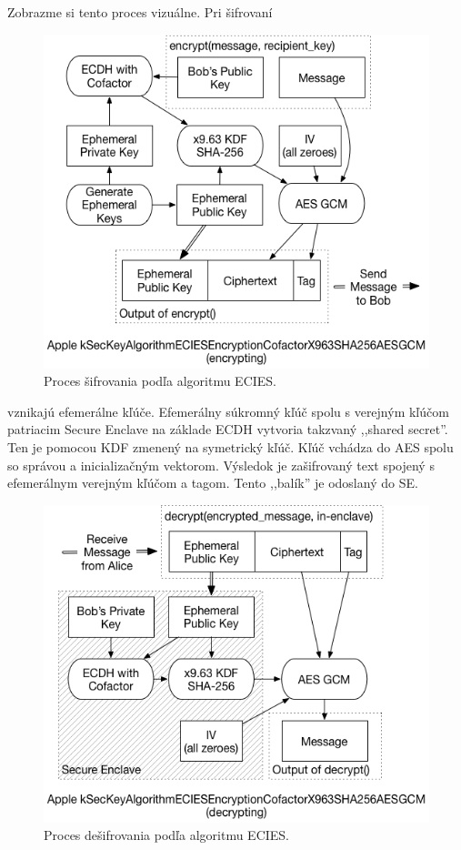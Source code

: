 \noindent Zobrazme si tento proces vizuálne. Pri šifrovaní
\begin{figure}[H]
  \centering
  \includegraphics[width=15cm]{img/ecies-arch-encrypt.png}
  \caption{Proces šifrovania podľa algoritmu ECIES.}
  \label{SEencr}
\end{figure}

\noindent vznikajú efemerálne kľúče. Efemerálny súkromný kľúč spolu s verejným kľúčom patriacim Secure Enclave na základe ECDH vytvoria takzvaný ,,shared secret''. Ten je pomocou KDF zmenený na symetrický kľúč. Kľúč vchádza do AES spolu so správou a inicializačným vektorom. Výsledok je zašifrovaný text spojený s efemerálnym verejným kľúčom a tagom. Tento ,,balík'' je odoslaný do SE. 
\begin{figure}[H]
  \centering
  \includegraphics[width=15cm]{img/ecies-arch-decrypt.png}
  \caption{Proces dešifrovania podľa algoritmu ECIES.}
  \label{SEdecr}
\end{figure}

